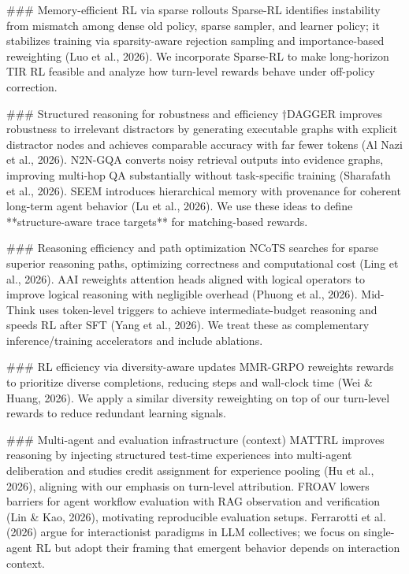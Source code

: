 ### Memory-efficient RL via sparse rollouts
Sparse-RL identifies instability from mismatch among dense old policy, sparse sampler, and learner policy; it stabilizes training via sparsity-aware rejection sampling and importance-based reweighting (Luo et al., 2026). We incorporate Sparse-RL to make long-horizon TIR RL feasible and analyze how turn-level rewards behave under off-policy correction.

### Structured reasoning for robustness and efficiency
†DAGGER improves robustness to irrelevant distractors by generating executable graphs with explicit distractor nodes and achieves comparable accuracy with far fewer tokens (Al Nazi et al., 2026). N2N-GQA converts noisy retrieval outputs into evidence graphs, improving multi-hop QA substantially without task-specific training (Sharafath et al., 2026). SEEM introduces hierarchical memory with provenance for coherent long-term agent behavior (Lu et al., 2026). We use these ideas to define **structure-aware trace targets** for matching-based rewards.

### Reasoning efficiency and path optimization
NCoTS searches for sparse superior reasoning paths, optimizing correctness and computational cost (Ling et al., 2026). AAI reweights attention heads aligned with logical operators to improve logical reasoning with negligible overhead (Phuong et al., 2026). Mid-Think uses token-level triggers to achieve intermediate-budget reasoning and speeds RL after SFT (Yang et al., 2026). We treat these as complementary inference/training accelerators and include ablations.

### RL efficiency via diversity-aware updates
MMR-GRPO reweights rewards to prioritize diverse completions, reducing steps and wall-clock time (Wei & Huang, 2026). We apply a similar diversity reweighting on top of our turn-level rewards to reduce redundant learning signals.

### Multi-agent and evaluation infrastructure (context)
MATTRL improves reasoning by injecting structured test-time experiences into multi-agent deliberation and studies credit assignment for experience pooling (Hu et al., 2026), aligning with our emphasis on turn-level attribution. FROAV lowers barriers for agent workflow evaluation with RAG observation and verification (Lin & Kao, 2026), motivating reproducible evaluation setups. Ferrarotti et al. (2026) argue for interactionist paradigms in LLM collectives; we focus on single-agent RL but adopt their framing that emergent behavior depends on interaction context.

